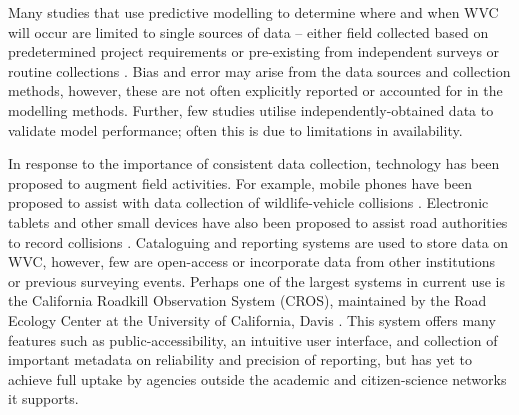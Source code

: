 Many studies that use predictive modelling to determine where and when WVC will occur are limited to single sources of data -- either field collected based on predetermined project requirements \citep[e.g.][]{lang09,roge09} or pre-existing from independent surveys or routine collections \citep[e.g.][]{hoth12,malo04}. Bias and error may arise from the data sources and collection methods, however, these are not often explicitly reported or accounted for in the modelling methods. Further, few studies utilise independently-obtained data to validate model performance; often this is due to limitations in availability.

In response to the importance of consistent data collection, technology has been proposed to augment field activities. For example, mobile phones have been proposed to assist with data collection of wildlife-vehicle collisions \citep[see][]{aane09,olso14}. Electronic tablets and other small devices have also been proposed to assist road authorities to record collisions \citep{amen07}. Cataloguing and reporting systems are used to store data on WVC, however, few are open-access or incorporate data from other institutions or previous surveying events. Perhaps one of the largest systems in current use is the California Roadkill Observation System (CROS), maintained by the Road Ecology Center at the University of California, Davis \citep[see][]{shil15b}. This system offers many features such as public-accessibility, an intuitive user interface, and collection of important metadata on reliability and precision of reporting, but has yet to achieve full uptake by agencies outside the academic and citizen-science networks it supports.

